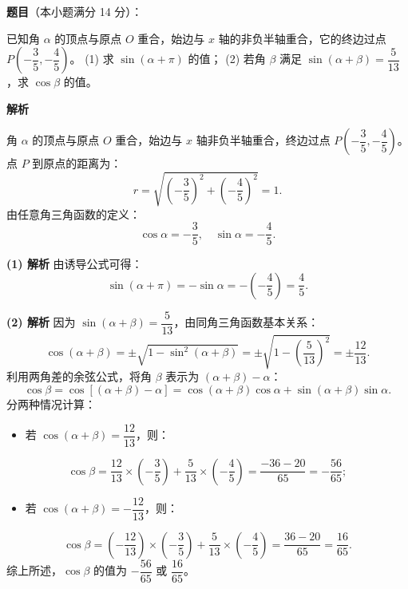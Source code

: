 \begin{answer}

\textbf{题目}（本小题满分 14 分）：

已知角 $\alpha$ 的顶点与原点 $O$ 重合，始边与 $x$ 轴的非负半轴重合，它的终边过点 $P\left(-\dfrac35, -\dfrac45\right)$。
(1) 求 $\sin(\alpha + \pi)$ 的值；
(2) 若角 $\beta$ 满足 $\sin(\alpha + \beta) = \dfrac{5}{13}$，求 $\cos\beta$ 的值。

\textbf{解析}

角 $\alpha$ 的顶点与原点 $O$ 重合，始边与 $x$ 轴非负半轴重合，终边过点 $P\left(-\dfrac35, -\dfrac45\right)$。
点 $P$ 到原点的距离为：
\nopagebreak[4]
\[r = \sqrt{\left(-\dfrac35\right)^2 + \left(-\dfrac45\right)^2} = 1.\]
由任意角三角函数的定义：
\nopagebreak[4]
\[\cos\alpha = -\dfrac35,\quad \sin\alpha = -\dfrac45.\]

\textbf{(1) 解析} 由诱导公式可得：
\nopagebreak[4]
\[\sin(\alpha + \pi) = -\sin\alpha = -\left(-\dfrac45\right) = \dfrac45.\]

\textbf{(2) 解析} 因为 $\sin(\alpha + \beta) = \dfrac{5}{13}$，由同角三角函数基本关系：
\nopagebreak[4]
\[\cos(\alpha + \beta) = \pm\sqrt{1 - \sin^2(\alpha + \beta)} = \pm\sqrt{1 - \left(\dfrac{5}{13}\right)^2} = \pm\dfrac{12}{13}.\]
利用两角差的余弦公式，将角 $\beta$ 表示为 $(\alpha + \beta) - \alpha$：
\nopagebreak[4]
\[\cos\beta = \cos[(\alpha + \beta) - \alpha] = \cos(\alpha + \beta)\cos\alpha + \sin(\alpha + \beta)\sin\alpha.\]
分两种情况计算：
\begin{itemize}
\item 若 $\cos(\alpha + \beta) = \dfrac{12}{13}$，则：
\end{itemize}
\nopagebreak[4]
\[\cos\beta = \dfrac{12}{13} \times \left(-\dfrac35\right) + \dfrac{5}{13} \times \left(-\dfrac45\right) = \dfrac{-36 - 20}{65} = -\dfrac{56}{65};\]
\begin{itemize}
\item 若 $\cos(\alpha + \beta) = -\dfrac{12}{13}$，则：
\end{itemize}
\nopagebreak[4]
\[\cos\beta = \left(-\dfrac{12}{13}\right) \times \left(-\dfrac35\right) + \dfrac{5}{13} \times \left(-\dfrac45\right) = \dfrac{36 - 20}{65} = \dfrac{16}{65}.\]
综上所述，$\cos\beta$ 的值为 $-\dfrac{56}{65}$ 或 $\dfrac{16}{65}$。



\end{answer}
